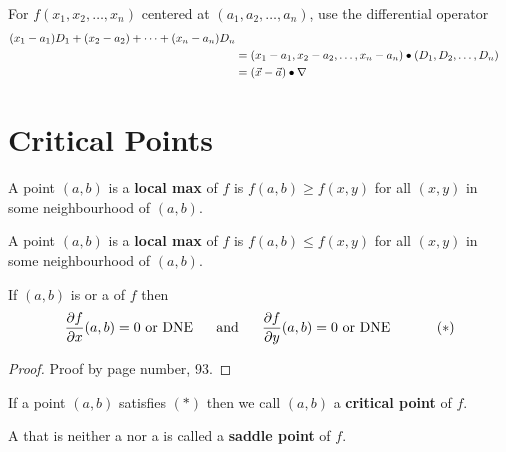 \documentclass[english, 11pt]{article}
\begin{document}
For $f(x_1,x_2,\ldots,x_n)$ centered at $(a_1,a_2,\ldots,a_n)$, use the differential operator
\begin{align*}
  (x_1 - a_1)D_1 + (x_2 - a_2) + \cdots + (x_n - a_n)D_n \\
  & = (x_1-a_1,x_2-a_2, \ldots, x_n - a_n)\bullet (D_1,D_2,\ldots,D_n) \\
  & = (\vec{x} - \vec{a}) \bullet \nabla
\end{align*}

\section{Critical Points}

\begin{defn}\label{local max}
A point $(a,b)$ is a \textbf{local max} of $f$ is $f(a,b) \geq f(x,y)$ for all $(x,y)$ in some neighbourhood of $(a,b)$.
\end{defn}
\begin{defn}\label{local min}
A point $(a,b)$ is a \textbf{local max} of $f$ is $f(a,b) \leq f(x,y)$ for all $(x,y)$ in some neighbourhood of $(a,b)$.
\end{defn}

\begin{thrm}
  If $(a,b)$ is  or a  of $f$ then
  \[ \pfx (a,b) = 0 \mbox{ or DNE} \ \ \ \ \ \mbox{and} \ \ \ \ \ \pfy (a,b) = 0\mbox{ or DNE}  \ \ \ \ \ \ \ \ \ \ (*)\]
\end{thrm}

\begin{proof}
  Proof by page number, 93.
\end{proof}

\begin{defn}\label{critical point}
If a point $(a,b)$ satisfies $(*)$ then we call $(a,b)$ a \textbf{critical point} of $f$.
\end{defn}

\begin{defn}\label{saddle point}
A  that is neither a  nor a  is called a \textbf{saddle point} of $f$.
\end{defn}
\end{document}
